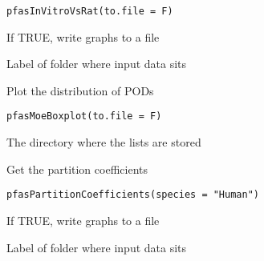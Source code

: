\documentclass[letterpaper]{book}
\begin{document}
%
\begin{Usage}
\begin{verbatim}
pfasInVitroVsRat(to.file = F)
\end{verbatim}
\end{Usage}
%
\begin{Arguments}
\begin{ldescription}
\item[\code{to.file}] If TRUE, write graphs to a file

\item[\code{data.version}] Label of folder where input data sits
\end{ldescription}
\end{Arguments}
%
\begin{Description}\relax
Plot the distribution of PODs
\end{Description}
%
\begin{Usage}
\begin{verbatim}
pfasMoeBoxplot(to.file = F)
\end{verbatim}
\end{Usage}
%
\begin{Arguments}
\begin{ldescription}
\item[\code{dir}] The directory where the lists are stored
\end{ldescription}
\end{Arguments}
%
\begin{Description}\relax
Get the partition coefficients
\end{Description}
%
\begin{Usage}
\begin{verbatim}
pfasPartitionCoefficients(species = "Human")
\end{verbatim}
\end{Usage}
%
\begin{Arguments}
\begin{ldescription}
\item[\code{to.file}] If TRUE, write graphs to a file

\item[\code{data.version}] Label of folder where input data sits
\end{ldescription}
\end{Arguments}
\end{document}
